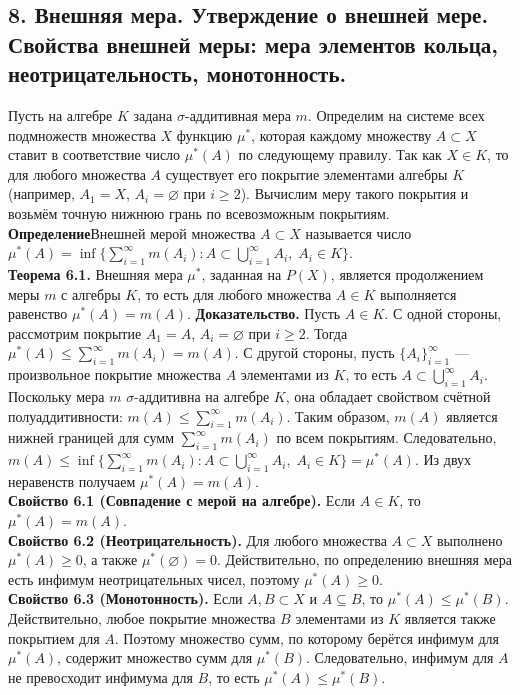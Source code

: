 \documentclass[12pt]{article}
\begin{document}
\subsection*{8. Внешняя мера. Утверждение о внешней мере. Свойства внешней меры: мера
элементов кольца, неотрицательность, монотонность.}
Пусть на алгебре $K$ задана $\sigma$-аддитивная мера $m$. Определим на системе всех подмножеств множества $X$ функцию $\mu^{*}$, которая каждому множеству $A \subset X$ ставит в соответствие число $\mu^{*}(A)$ по следующему правилу. Так как $X \in K$, то для любого множества $A$ существует его покрытие элементами алгебры $K$ (например, $A_{1} = X$, $A_{i} = \varnothing$ при $i \geq 2$). Вычислим меру такого покрытия и возьмём точную нижнюю грань по всевозможным покрытиям. 
\\\textbf{Определение}Внешней мерой множества $A \subset X$ называется число $\mu^{*}(A) = \inf \{ \sum_{i=1}^{\infty} m(A_{i}) : A \subset \bigcup_{i=1}^{\infty} A_{i}, \; A_{i} \in K \}$. \\\textbf{Теорема 6.1.} Внешняя мера $\mu^{*}$, заданная на $P(X)$, является продолжением меры $m$ с алгебры $K$, то есть для любого множества $A \in K$ выполняется равенство $\mu^{*}(A) = m(A)$. \textbf{Доказательство.} Пусть $A \in K$. С одной стороны, рассмотрим покрытие $A_{1} = A$, $A_{i} = \varnothing$ при $i \geq 2$. Тогда $\mu^{*}(A) \leq \sum_{i=1}^{\infty} m(A_{i}) = m(A)$. С другой стороны, пусть $\{A_{i}\}_{i=1}^{\infty}$ — произвольное покрытие множества $A$ элементами из $K$, то есть $A \subset \bigcup_{i=1}^{\infty} A_{i}$. Поскольку мера $m$ $\sigma$-аддитивна на алгебре $K$, она обладает свойством счётной полуаддитивности: $m(A) \leq \sum_{i=1}^{\infty} m(A_{i})$. Таким образом, $m(A)$ является нижней границей для сумм $\sum_{i=1}^{\infty} m(A_{i})$ по всем покрытиям. Следовательно, $m(A) \leq \inf \{ \sum_{i=1}^{\infty} m(A_{i}) : A \subset \bigcup_{i=1}^{\infty} A_{i}, \; A_{i} \in K \} = \mu^{*}(A)$. Из двух неравенств получаем $\mu^{*}(A) = m(A)$. \\\textbf{Свойство 6.1 (Совпадение с мерой на алгебре).} Если $A \in K$, то $\mu^{*}(A) = m(A)$. \\\textbf{Свойство 6.2 (Неотрицательность).} Для любого множества $A \subset X$ выполнено $\mu^{*}(A) \geq 0$, а также $\mu^{*}(\varnothing) = 0$. Действительно, по определению внешняя мера есть инфимум неотрицательных чисел, поэтому $\mu^{*}(A) \geq 0$.\\\textbf{Свойство 6.3 (Монотонность).} Если $A, B \subset X$ и $A \subseteq B$, то $\mu^{*}(A) \leq \mu^{*}(B)$. Действительно, любое покрытие множества $B$ элементами из $K$ является также покрытием для $A$. Поэтому множество сумм, по которому берётся инфимум для $\mu^{*}(A)$, содержит множество сумм для $\mu^{*}(B)$. Следовательно, инфимум для $A$ не превосходит инфимума для $B$, то есть $\mu^{*}(A) \leq \mu^{*}(B)$.
\end{document}
